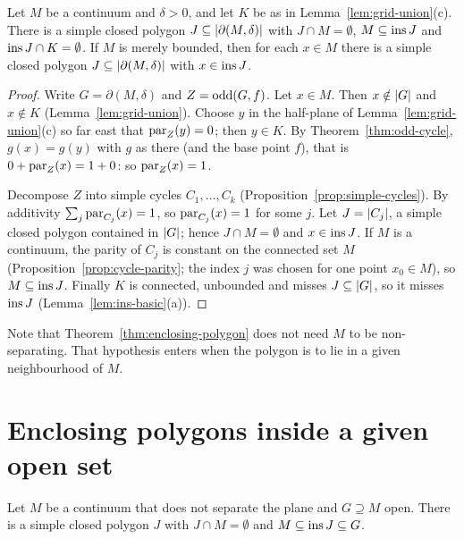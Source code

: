\begin{theorem}\label{thm:enclosing-polygon}
Let $M$ be a continuum and $\delta>0$, and let $K$ be as in Lemma~\ref{lem:grid-union}(c). There is a
simple closed polygon $J\subseteq\lvert \partial(M,\delta)\rvert$ with $J\cap M=\emptyset$, $M\subseteq\operatorname{ins} J$
and $\operatorname{ins} J\cap K=\emptyset$. If $M$ is merely bounded, then for each $x\in M$ there is a simple closed
polygon $J\subseteq\lvert \partial(M,\delta)\rvert$ with $x\in\operatorname{ins} J$.
\end{theorem}

\begin{proof}
Write $G=\partial(M,\delta)$ and $Z=\operatorname{odd}(G,f)$. Let $x\in M$. Then $x\notin\lvert G\rvert$ and $x\notin K$
(Lemma~\ref{lem:grid-union}). Choose $y$ in the half-plane of Lemma~\ref{lem:grid-union}(c) so far
east that $\operatorname{par}_Z(y)=0$; then $y\in K$. By Theorem~\ref{thm:odd-cycle}, $g(x)=g(y)$ with $g$ as
there (and the base point $f$), that is $0+\operatorname{par}_Z(x)=1+0$: so $\operatorname{par}_Z(x)=1$.

Decompose $Z$ into simple cycles $C_1,\dots,C_k$ (Proposition~\ref{prop:simple-cycles}). By
additivity $\sum_j\operatorname{par}_{C_j}(x)=1$, so $\operatorname{par}_{C_j}(x)=1$ for some $j$. Let $J=\lvert C_j\rvert$, a simple
closed polygon contained in $\lvert G\rvert$; hence $J\cap M=\emptyset$ and $x\in\operatorname{ins} J$. If $M$ is a
continuum, the parity of $C_j$ is constant on the connected set $M$ (Proposition~\ref{prop:cycle-parity};
the index $j$ was chosen for one point $x_0\in M$), so $M\subseteq\operatorname{ins} J$. Finally $K$ is connected,
unbounded and misses $J\subseteq\lvert G\rvert$, so it misses $\operatorname{ins} J$ (Lemma~\ref{lem:ins-basic}(a)).
\end{proof}


Note that Theorem~\ref{thm:enclosing-polygon} does not need $M$ to be non-separating. That
hypothesis enters when the polygon is to lie in a given neighbourhood of $M$.

\section{Enclosing polygons inside a given open set}

\begin{theorem}\label{thm:enclose}
Let $M$ be a continuum that does not separate the plane and $G\supseteq M$ open. There is a simple
closed polygon $J$ with $J\cap M=\emptyset$ and $M\subseteq\operatorname{ins} J\subseteq G$.
\end{theorem}


